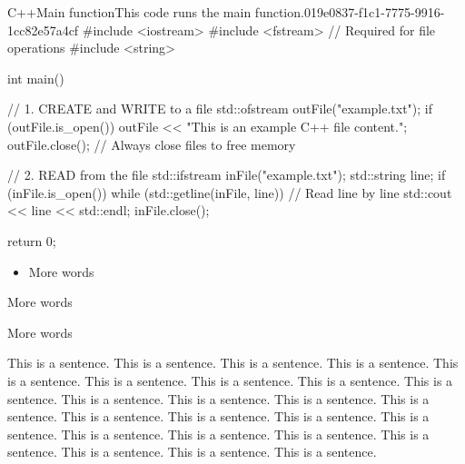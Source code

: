 \begin{notebookcodeblock}{C++}{Main function}{This code runs the main function.}{019e0837-f1c1-7775-9916-1cc82e57a4cf}
#include <iostream>
#include <fstream> // Required for file operations
#include <string>

int main() {
    // 1. CREATE and WRITE to a file
    std::ofstream outFile("example.txt"); 
    if (outFile.is_open()) {
        outFile << "This is an example C++ file content.\n";
        outFile.close(); // Always close files to free memory
    }

    // 2. READ from the file
    std::ifstream inFile("example.txt");
    std::string line;
    if (inFile.is_open()) {
        while (std::getline(inFile, line)) { // Read line by line
            std::cout << line << std::endl;
        }
        inFile.close();
    }

    return 0;
}
\end{notebookcodeblock}


\begin{itemize}
  \item More words
\end{itemize}


More words


More words


This is a sentence. This is a sentence. This is a sentence. This is a sentence. This is a sentence. This is a sentence. This is a sentence. This is a sentence. This is a sentence. This is a sentence. This is a sentence. This is a sentence. This is a sentence. This is a sentence. This is a sentence. This is a sentence. This is a sentence. This is a sentence. This is a sentence. This is a sentence. This is a sentence. This is a sentence. This is a sentence. This is a sentence.

